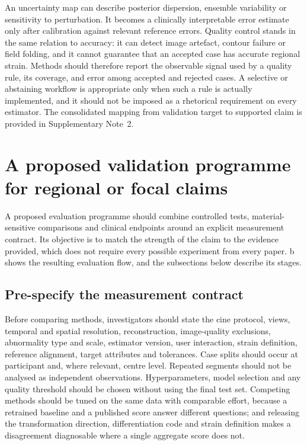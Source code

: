 An uncertainty map can describe posterior dispersion, ensemble variability or sensitivity to perturbation. It becomes a clinically interpretable error estimate only after calibration against relevant reference errors. Quality control stands in the same relation to accuracy: it can detect image artefact, contour failure or field folding, and it cannot guarantee that an accepted case has accurate regional strain. Methods should therefore report the observable signal used by a quality rule, its coverage, and error among accepted and rejected cases. A selective or abstaining workflow is appropriate only when such a rule is actually implemented, and it should not be imposed as a rhetorical requirement on every estimator. The consolidated mapping from validation target to supported claim is provided in Supplementary Note~2.

\section{A proposed validation programme for regional or focal claims}\label{sec:programme}

A proposed evaluation programme should combine controlled tests, material-sensitive comparisons and clinical endpoints around an explicit measurement contract. Its objective is to match the strength of the claim to the evidence provided, which does not require every possible experiment from every paper. b shows the resulting evaluation flow, and the subsections below describe its stages.

\subsection{Pre-specify the measurement contract}

Before comparing methods, investigators should state the cine protocol, views, temporal and spatial resolution, reconstruction, image-quality exclusions, abnormality type and scale, estimator version, user interaction, strain definition, reference alignment, target attributes and tolerances. Case splits should occur at participant and, where relevant, centre level. Repeated segments should not be analysed as independent observations. Hyperparameters, model selection and any quality threshold should be chosen without using the final test set. Competing methods should be tuned on the same data with comparable effort, because a retrained baseline and a published score answer different questions; and releasing the transformation direction, differentiation code and strain definition makes a disagreement diagnosable where a single aggregate score does not.

